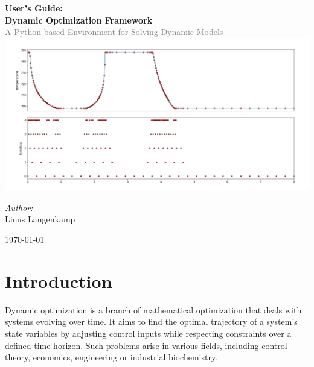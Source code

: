 \documentclass[12pt]{article}
\date{\today}
\begin{document}
	
	\begin{titlepage}
		\centering
		
		\vspace*{2cm}

		{\Huge\bfseries User's Guide:}\\[1em]
		
		{\Huge\bfseries Dynamic Optimization Framework}\\[0.5em]
		\textcolor{gray}{\large A Python-based Environment for Solving Dynamic Models}\\[1em]
		
		\vspace{2cm}
		\includegraphics[width=1\textwidth]{images/refinement.png}\par\vspace{1cm}
		\vspace{2cm}
		
		{\large \textit{Author:}}\\[0.5em]
		{\large Linus Langenkamp}
		
		\vfill
		
		{\large \today}
		
		\vspace*{1cm}
	\end{titlepage}
	
	\newpage
	\tableofcontents
	\newpage
	
	\section{Introduction}
	
	Dynamic optimization is a branch of mathematical optimization that deals with systems evolving over time. It aims to find the optimal trajectory of a system's state variables by adjusting control inputs while respecting constraints over a defined time horizon. Such problems arise in various fields, including control theory, economics, engineering or industrial biochemistry.
	
\end{document}
